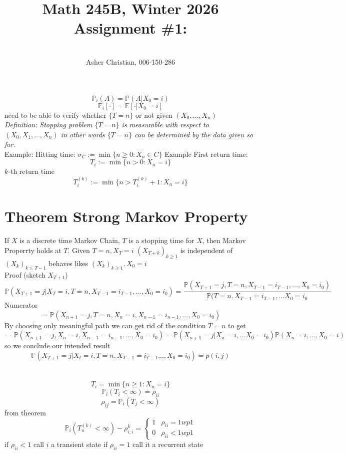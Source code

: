 \documentclass[11pt]{article}
\newcommand{\cnum}{Math 245B}
\newcommand{\ced}{Winter 2026}
\newcommand{\ctitle}[4]{\title{\vspace{-0.5in}\cnum, \ced\\Assignment #1: #2}\author{\vspace{-0.35in}\\#3, #4}}
\begin{document}
\ctitle{\#1}{}{Asher Christian}{006-150-286}
\date{}
\maketitle

\[
\mathbb{P}_i(A) = \mathbb{P}(A | X_0=i)
\] 
\[
    \mathbb{E}_i[\cdot] = \mathbb{E}[ \cdot | X_0=i]
\] 
need to be able to verify whether $\{T = n\}$ or not given  $(X_0,\dots,X_n)$ \\
\emph{
    Definition: Stopping problem $\{T = n\}$ is measurable with respect to  $(X_0,X_1,\dots,X_n)$
    in other words $\{T = n\}$ can be determined by the data given so far. \\
}
Example: Hitting time:
$\sigma_C := \min\{n \ge 0: X_n \in C\}$
Example First return time:
\[
    T_i := \min\{n > 0: X_n = i\}
\] 
$k$-th return time
\[
    T_i^{(k)} := \min\{n > T_i^{(k)}+1:X_n = i\}
\] 

\section{Theorem Strong Markov Property}
If $X$ is a discrete time Markov Chain, $T $ is a stopping time for  $X$, then Markov Properrty holds at  $T$.
Given $T = n, X_T = i$  $(X_{T+k})_{k \ge 1}$ is independent of  $(X_k)_{k \le T-1}$ behaves likes  $(X_k)_{k \ge 1}, X_0 =i$\\
Proof (sketch $X_{T+1}$)
\[
    \mathbb{P}(X_{T+1} = j | X_T = i, T=n, X_{T-1} = i_{T-1},\dots,X_0=i_0) = \frac{\mathbb{P}(X_{T+1}  =j , T=n, X_{T-1} = i_{T-1},\dots,X_0=i_0)}{ \mathbb{P}(T=n,X_{T-1}=i_{T-1},\dots X_0 = i_0}
\] 
Numerator 
\[
    = \mathbb{P}(X_{n+1}=j,T=n,X_n=i,X_{n-1} = i_{n-1},\dots,X_0=i_0)
\] 
By choosing only meaningful path we can get rid of the condition $T = n$ to get
 \[
     = \mathbb{P}(X_{n+1} =j, X_n = i,X_{n-1} = i_{n-1},\dots,X_0=i_0) = \mathbb{P}(X_{n+1} = j | X_{n} = i, \dots X_0=i_0) \mathbb{P}(X_n = i, \dots, X_0=i)
\] 
so we conclude our intended result
\[
    \mathbb{P}(X_{T+1} = j| X_t = i, T=n, X_{T-1} = i_{T-1}\dots,X_0=i_0) = p(i,j)
\] 

\section{}
\[
    T_i = \min\{n \ge 1 : X_n = i\}
\] 
\[
    \mathbb{P}_i(T_i < \infty) = \rho_{ii}
\] 
\[
    \rho_{ij} = \mathbb{P}_i(T_j < \infty)
\] 
from theorem
\[
    \mathbb{P}_i(T_n^{(k)} < \infty) - \rho_{i,i}^{k} = 
    \begin{cases}
        1 & \rho_{ii} = 1 wp 1\\
        0 & \rho_{ii} < 1 wp 1
    \end{cases}
\] 
if $\rho_{ii} < 1$ call $i$ a transient state
if  $\rho_{ii} = 1$ call it a recurrent state
\end{document}

